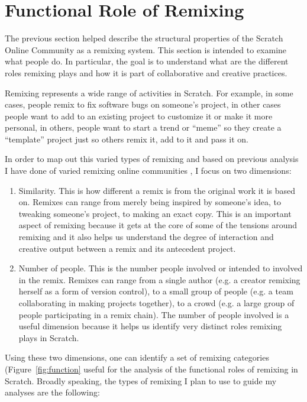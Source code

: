\section{Functional Role of Remixing}

The previous section helped describe the structural properties of the Scratch Online Community as a remixing system.
This section is intended to examine what people do.
In particular, the goal is to understand what are the different roles remixing plays and how it is part of collaborative and creative practices.

Remixing represents a wide range of activities in Scratch.
For example, in some cases, people remix to fix software bugs on someone's project, in other cases people want to add to an existing project to customize it or make it more personal, in others, people want to start a trend or ``meme'' so they create a ``template'' project just so others remix it, add to it and pass it on.

In order to map out this varied types of remixing and based on previous analysis I have done of varied remixing online communities \citep{seneviratne_remix_2010}, I focus on two dimensions:
\begin{enumerate}
\item{Similarity}. This is how different a remix is from the original work it is based on. 
Remixes can range from merely being inspired by someone's idea, to tweaking someone's project, to making an exact copy.
This is an important aspect of remixing because it gets at the core of some of the tensions around remixing and it also helps us understand the degree of interaction and creative output between a remix and its antecedent project.
\item{Number of people}. This is the number people involved or intended to involved in the remix.
Remixes can range from a single author (e.g. a creator remixing herself as a form of version control), to a small group of people (e.g. a team collaborating in making projects together), to a crowd (e.g. a large group of people participating in a remix chain).
The number of people involved is a useful dimension because it helps us identify very distinct roles remixing plays in Scratch.
\end{enumerate}

Using these two dimensions, one can identify a set of remixing categories (Figure~\ref{fig:function} useful for the analysis of the functional roles of remixing in Scratch.
Broadly speaking, the types of remixing I plan to use to guide my analyses are the following:


